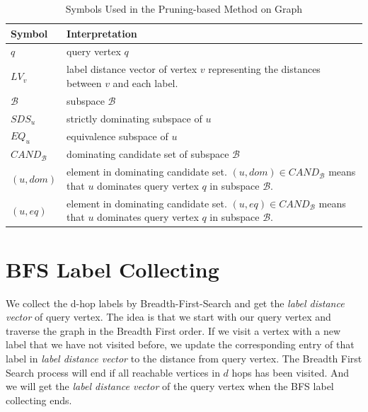 \begin{table}[h]
\centering
\begin{tabular}{|l|p{11cm}|}
\hline
Symbol                      & Interpretation                                                                                                                                     \\ \hline
$q$                         & query vertex $q$                                                                                                                                   \\ \hline
$LV_v$                      & label distance vector of vertex $v$ representing the distances between $v$ and each label.                                                         \\ \hline
$\mathcal{B}$               & subspace $\mathcal{B}$                                                                                                                             \\ \hline
$\mathit{SDS}_u$            & strictly dominating subspace of $u$                                                                                                                \\ \hline
$\mathit{EQ}_u$             & equivalence subspace of $u$                                                                                                                        \\ \hline
$\mathit{CAND}_\mathcal{B}$ & dominating candidate set of subspace $\mathcal{B}$                                                                                                 \\ \hline
$(u, dom)$                  & element in dominating candidate set. $(u, dom) \in \mathit{CAND}_\mathcal{B}$ means that $u$ dominates query vertex $q$ in subspace $\mathcal{B}$. \\ \hline
$(u, eq)$                   & element in dominating candidate set. $(u, eq) \in \mathit{CAND}_\mathcal{B}$ means that $u$ dominates query vertex $q$ in subspace $\mathcal{B}$.  \\ \hline
\end{tabular}
    \caption{\label{tab:symbol_graph}Symbols Used in the Pruning-based Method on Graph}
\end{table}

\section{BFS Label Collecting}
\label{sec:bfs-collect}
We collect the d-hop labels by Breadth-First-Search and get the \emph{label distance vector} of query vertex. The idea is that we start with our query vertex and traverse the graph in the Breadth First order. If we visit a vertex with a new label that we have not visited before, we update the corresponding entry of that label in \emph{label distance vector} to the distance from query vertex. The Breadth First Search process will end if all reachable vertices in $d$ hops has been visited. And we will get the \emph{label distance vector} of the query vertex when the BFS label collecting ends.

